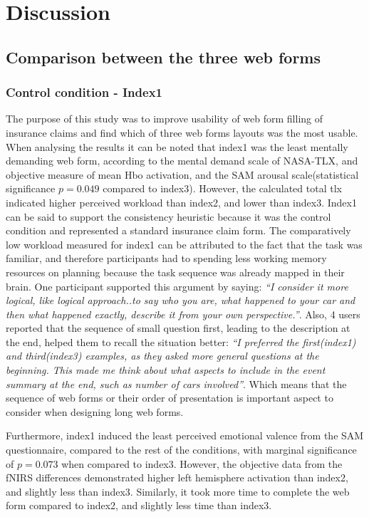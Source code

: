 \documentclass[a4paper]{report}
\begin{document}
\chapter{Discussion}
	\section{Comparison between the three web forms}
		\subsection{Control condition - Index1}
			The purpose of this study was to improve usability of web form filling of insurance claims and find which of three web forms layouts was the most usable. When analysing the results it can be noted that index1 was the least mentally demanding web form, according to the mental demand scale of NASA-TLX, and objective measure of mean Hbo activation, and the SAM arousal scale(statistical significance $p=0.049$ compared to index3). However, the calculated total tlx indicated higher perceived workload than index2, and lower than index3. Index1 can be said to support the consistency heuristic\cite{nielsen1990heuristic} because it was the control condition and represented a standard insurance claim form. The comparatively low workload measured for index1 can be attributed to the fact that the task was familiar, and therefore participants had to spending less working memory resources on planning because the task sequence was already mapped in their brain. One participant supported this argument by saying: \textit{``I consider it more logical, like logical approach..to say who you are, what happened to your car and then what happened exactly, describe it from your own perspective.''}. Also, 4 users reported that the sequence of small question first, leading to the description at the end, helped them to recall the situation better: \textit{``I preferred the first(index1) and third(index3) examples, as they asked more general questions at the beginning. This made me think about what aspects to include in the event summary at the end, such as number of cars involved''}. Which means that the sequence of web forms or their order of presentation is important aspect to consider when designing long web forms.
		
			Furthermore, index1 induced the least perceived emotional valence from the SAM questionnaire, compared to the rest of the conditions, with marginal significance of $p=0.073$ when compared to index3. However, the objective data from the fNIRS differences demonstrated higher left hemisphere activation than index2, and slightly less than index3. Similarly, it took more time to complete the web form compared to index2, and slightly less time than index3.	
	
\end{document}
